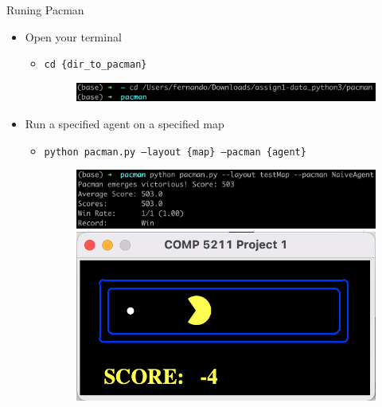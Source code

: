 \documentclass{beamer}
\begin{document}
\begin{frame}{Runing Pacman}
    \begin{itemize}
        \item Open your terminal
        \begin{itemize}
             \item \texttt{cd \{dir\_to\_pacman\}}
             \begin{figure}[htpb]
                \centering
                \includegraphics[width=1\linewidth]{pic/cd_pacman.png}
            \end{figure}
        \end{itemize}

        \item Run a specified agent on a specified map
        \begin{itemize}
             \item \texttt{python pacman.py --layout \{map\} --pacman \{agent\}}
             \begin{figure}[htpb]
                \centering
                \includegraphics[width=1\linewidth]{pic/runnaive.png}
                \includegraphics[width=0.4\linewidth]{pic/naive.png}
            \end{figure}
        \end{itemize}
    \end{itemize}
\end{frame}
\end{document}
